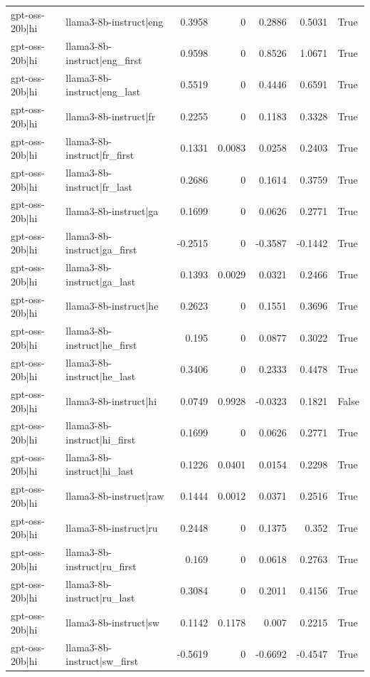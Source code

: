 \begin{table}
\begin{tabular}{l l r r r r l}
gpt-oss-20b|hi & llama3-8b-instruct|eng & 0.3958 & 0 & 0.2886 & 0.5031 & True \\
gpt-oss-20b|hi & llama3-8b-instruct|eng_first & 0.9598 & 0 & 0.8526 & 1.0671 & True \\
gpt-oss-20b|hi & llama3-8b-instruct|eng_last & 0.5519 & 0 & 0.4446 & 0.6591 & True \\
gpt-oss-20b|hi & llama3-8b-instruct|fr & 0.2255 & 0 & 0.1183 & 0.3328 & True \\
gpt-oss-20b|hi & llama3-8b-instruct|fr_first & 0.1331 & 0.0083 & 0.0258 & 0.2403 & True \\
gpt-oss-20b|hi & llama3-8b-instruct|fr_last & 0.2686 & 0 & 0.1614 & 0.3759 & True \\
gpt-oss-20b|hi & llama3-8b-instruct|ga & 0.1699 & 0 & 0.0626 & 0.2771 & True \\
gpt-oss-20b|hi & llama3-8b-instruct|ga_first & -0.2515 & 0 & -0.3587 & -0.1442 & True \\
gpt-oss-20b|hi & llama3-8b-instruct|ga_last & 0.1393 & 0.0029 & 0.0321 & 0.2466 & True \\
gpt-oss-20b|hi & llama3-8b-instruct|he & 0.2623 & 0 & 0.1551 & 0.3696 & True \\
gpt-oss-20b|hi & llama3-8b-instruct|he_first & 0.195 & 0 & 0.0877 & 0.3022 & True \\
gpt-oss-20b|hi & llama3-8b-instruct|he_last & 0.3406 & 0 & 0.2333 & 0.4478 & True \\
gpt-oss-20b|hi & llama3-8b-instruct|hi & 0.0749 & 0.9928 & -0.0323 & 0.1821 & False \\
gpt-oss-20b|hi & llama3-8b-instruct|hi_first & 0.1699 & 0 & 0.0626 & 0.2771 & True \\
gpt-oss-20b|hi & llama3-8b-instruct|hi_last & 0.1226 & 0.0401 & 0.0154 & 0.2298 & True \\
gpt-oss-20b|hi & llama3-8b-instruct|raw & 0.1444 & 0.0012 & 0.0371 & 0.2516 & True \\
gpt-oss-20b|hi & llama3-8b-instruct|ru & 0.2448 & 0 & 0.1375 & 0.352 & True \\
gpt-oss-20b|hi & llama3-8b-instruct|ru_first & 0.169 & 0 & 0.0618 & 0.2763 & True \\
gpt-oss-20b|hi & llama3-8b-instruct|ru_last & 0.3084 & 0 & 0.2011 & 0.4156 & True \\
gpt-oss-20b|hi & llama3-8b-instruct|sw & 0.1142 & 0.1178 & 0.007 & 0.2215 & True \\
gpt-oss-20b|hi & llama3-8b-instruct|sw_first & -0.5619 & 0 & -0.6692 & -0.4547 & True \\

\end{tabular}
\end{table}
